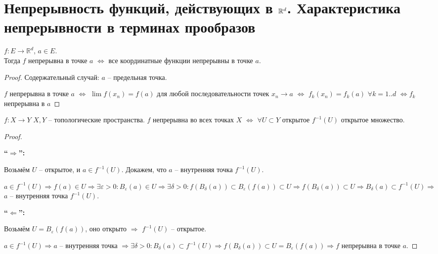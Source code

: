 
\section{Непрерывность функций, действующих в $\mathbb{R}^d$. Характеристика непрерывности в терминах прообразов}


\begin{theorem-non}
\end{theorem-non}
$f : E \rightarrow \mathbb{R}^d$, $a \in E$. \\
Тогда $f$ непрерывна в точке $a$ $\Longleftrightarrow$ все координатные
функции непрерывны в точке $a$.

\begin{proof} Содержательный случай: $a$ -- предельная точка.

    $f$ непрерывна в точке $a$ $\Longleftrightarrow$ $\lim f(x_n) = f(a)$
    для любой последовательности точек $x_n \rightarrow a$
    $\Longleftrightarrow$ $f_k(x_n) = f_k(a) \,\, \forall k = 1..d$
    $\Longleftrightarrow f_k$ непрерывна в $a$

\end{proof}

\begin{theorem-non}
\end{theorem-non}

$f : X \rightarrow Y$ $X, Y$ -- топологические пространства.
$f$ непрерывна во всех точках $X$ $\Longleftrightarrow$
$\forall U \subset Y$ открытое $f^{-1}(U)$ открытое множество.

\begin{proof} $ $

    \textbf{``$\Longrightarrow$'':}

    Возьмём $U$ -- открытое, и $a \in f^{-1}(U)$.
    Докажем, что $a$ -- внутренняя точка $f^{-1}(U)$.
    
    $a \in f^{-1}(U) \Rightarrow f(a) \in U \Rightarrow \exists
    \varepsilon > 0 : B_{\varepsilon}(a) \in U \Rightarrow
    \exists \delta > 0 : f(B_{\delta}(a)) \subset B_{\varepsilon}(f(a))
    \subset U \Rightarrow f(B_{\delta}(a)) \subset U \Rightarrow
    B_{\delta}(a) \subset f^{-1}(U) \Rightarrow$ $a$ -- внутренняя точка
    $f^{-1}(U)$.

    \textbf{``$\Longleftarrow$'':}

    Возьмём $U = B_\varepsilon (f(a))$, оно открыто $\Rightarrow$
    $f^{-1}(U)$ -- открытое.

    $a \in f^{-1}(U) \Rightarrow a$ -- внутренняя точка $\Rightarrow
    \exists \delta > 0 : B_{\delta}(a) \subset f^{-1}(U) \Rightarrow
    f(B_{\delta}(a)) \subset U = B_\varepsilon(f(a)) \Rightarrow f$
    непрерывна в точке $a$.
\end{proof}